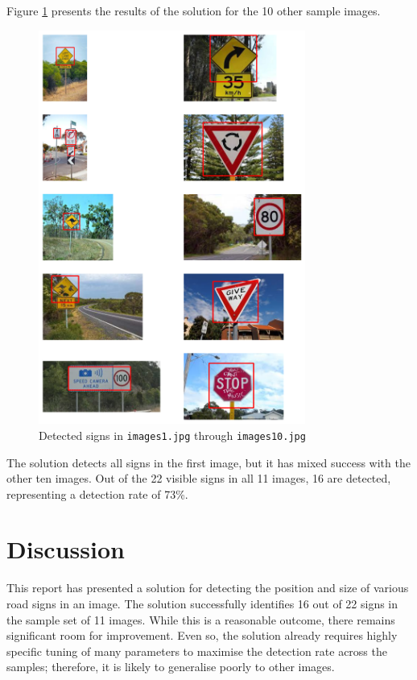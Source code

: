 \newpage

Figure \ref{fig:q1bresults} presents the results of the solution for the 10 other sample images.

\begin{figure}[ht]
  \centering
  \includegraphics[width=0.78\textwidth]{images/q1_results_b.png}
  \caption{Detected signs in \texttt{images1.jpg} through \texttt{images10.jpg}}
  \label{fig:q1bresults}
\end{figure}

The solution detects all signs in the first image, but it has mixed success with the other ten images. Out of the 22 visible signs in all 11 images, 16 are detected, representing a detection rate of 73\%.

\newpage
\section{Discussion}

This report has presented a solution for detecting the position and size of various road signs in an image. The solution successfully identifies 16 out of 22 signs in the sample set of 11 images. While this is a reasonable outcome, there remains significant room for improvement. Even so, the solution already requires highly specific tuning of many parameters to maximise the detection rate across the samples; therefore, it is likely to generalise poorly to other images.


